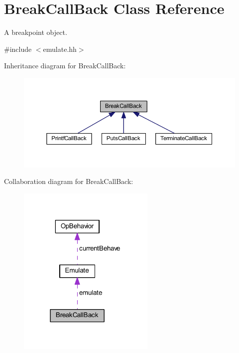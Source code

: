 \hypertarget{class_break_call_back}{}\section{Break\+Call\+Back Class Reference}
\label{class_break_call_back}


A breakpoint object.  




{\ttfamily \#include $<$emulate.\+hh$>$}



Inheritance diagram for Break\+Call\+Back\+:
\nopagebreak
\begin{figure}[H]
\begin{center}
\leavevmode
\includegraphics[width=350pt]{class_break_call_back__inherit__graph}
\end{center}
\end{figure}


Collaboration diagram for Break\+Call\+Back\+:
\nopagebreak
\begin{figure}[H]
\begin{center}
\leavevmode
\includegraphics[width=186pt]{class_break_call_back__coll__graph}
\end{center}
\end{figure}
